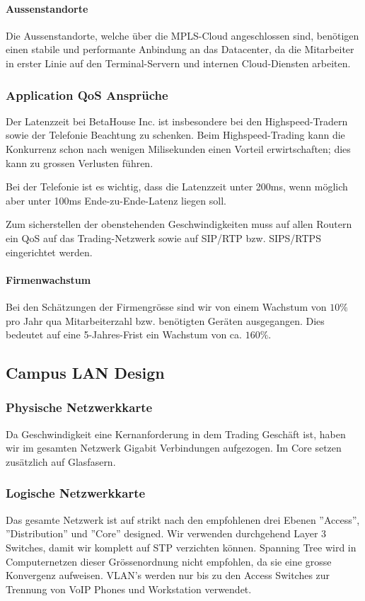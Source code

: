 \paragraph{Aussenstandorte}

Die Aussenstandorte, welche über die MPLS-Cloud angeschlossen sind, benötigen einen stabile und performante Anbindung an das Datacenter, da die Mitarbeiter in erster Linie auf den Terminal-Servern und internen Cloud-Diensten arbeiten.

\subsubsection{Application QoS Ansprüche}

Der Latenzzeit bei BetaHouse Inc. ist insbesondere bei den Highspeed-Tradern sowie der Telefonie Beachtung zu schenken. Beim Highspeed-Trading kann die Konkurrenz schon nach wenigen Milisekunden einen Vorteil erwirtschaften; dies kann zu grossen Verlusten führen.

Bei der Telefonie ist es wichtig, dass die Latenzzeit unter 200ms, wenn möglich aber unter 100ms Ende-zu-Ende-Latenz liegen soll.

Zum sicherstellen der obenstehenden Geschwindigkeiten muss auf allen Routern ein QoS auf das Trading-Netzwerk sowie auf SIP/RTP bzw. SIPS/RTPS eingerichtet werden.


\paragraph{Firmenwachstum}
Bei den Schätzungen der Firmengrösse sind wir von einem Wachstum von $10\%$ pro Jahr qua Mitarbeiterzahl bzw. benötigten Geräten ausgegangen. Dies bedeutet auf eine 5-Jahres-Frist ein Wachstum von ca. $160\%$. 

\subsection{Campus LAN Design}

\subsubsection{Physische Netzwerkkarte}
Da Geschwindigkeit eine Kernanforderung in dem Trading Geschäft ist, haben wir im gesamten Netzwerk Gigabit Verbindungen aufgezogen. Im Core setzen zusätzlich auf Glasfasern.

\subsubsection{Logische Netzwerkkarte}
Das gesamte Netzwerk ist auf strikt nach den empfohlenen drei Ebenen ''Access'', ''Distribution'' und ''Core'' designed. Wir verwenden durchgehend Layer 3 Switches, damit wir komplett auf STP verzichten können. Spanning Tree wird in Computernetzen dieser Grössenordnung nicht empfohlen, da sie eine grosse Konvergenz aufweisen. VLAN's werden nur bis zu den Access Switches zur Trennung von VoIP Phones und Workstation verwendet. 

